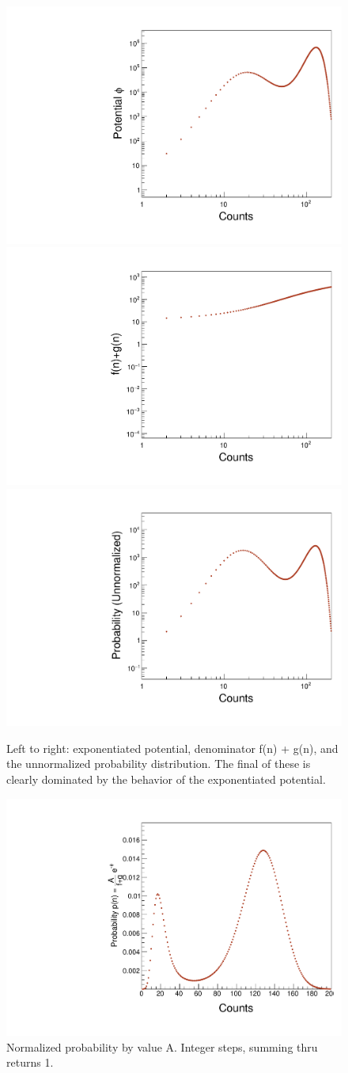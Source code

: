 \documentclass{article}
\begin{document}
\begin{figure}[H]
    \centering
    \includegraphics[width=.32\textwidth]{canvPotential_E.pdf} 
    \includegraphics[width=.32\textwidth]{canvPotential_Denom.pdf} 
    \includegraphics[width=.32\textwidth]{canvPotential_Prob.pdf} 
    \caption{Left to right: exponentiated potential, denominator f(n) + g(n), and the unnormalized probability distribution. The final of these is clearly dominated by the behavior of the exponentiated potential.}
    \label{fig5}
\end{figure}

\begin{figure}[H]
    \centering
    \includegraphics[width=.9\textwidth]{canvPotential_Prob2.pdf} 
    \caption{Normalized probability by value A. Integer steps, summing thru returns 1.}
    \label{fig6}
\end{figure}
\end{document}

